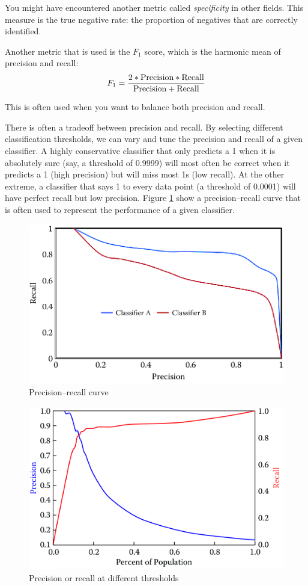 \documentclass[]{krantz}
\begin{document}
You might have encountered another metric called \emph{specificity} in
other fields. This measure is the true negative rate: the proportion of
negatives that are correctly identified.

Another metric that is used is the \(F_1\) score, which is the harmonic
mean of precision and recall:
\[F_1 =  \frac{2* {\rm Precision} * {\rm Recall}}{{\rm Precision} + {\rm Recall}}\]

This is often used when you want to balance both precision and recall.

There is often a tradeoff between precision and recall. By selecting
different classification thresholds, we can vary and tune the precision
and recall of a given classifier. A highly conservative classifier that
only predicts a 1 when it is absolutely sure (say, a threshold of
0.9999) will most often be correct when it predicts a 1 (high precision)
but will miss most 1s (low recall). At the other extreme, a classifier
that says 1 to every data point (a threshold of 0.0001) will have
perfect recall but low precision. Figure \ref{fig:pr} show a
precision--recall curve that is often used to represent the performance
of a given classifier.

\begin{figure}

{\centering \includegraphics[width=0.7\linewidth]{ChapterML/figures/pr} 

}

\caption{Precision--recall curve}\label{fig:pr}
\end{figure}

\begin{figure}

{\centering \includegraphics[width=0.7\linewidth]{ChapterML/figures/pr2} 

}

\caption{Precision or recall at different thresholds}\label{fig:pr2}
\end{figure}
\end{document}
